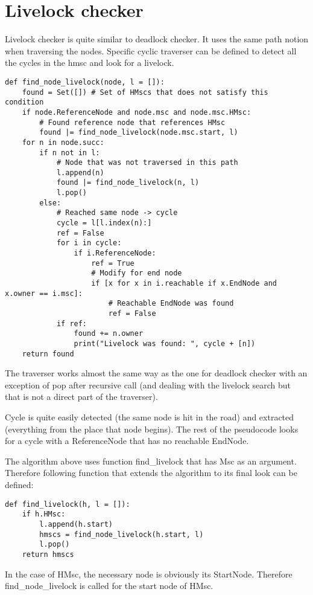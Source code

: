 \documentclass[11pt,oneside]{fithesis2}
\begin{document}
\section{Livelock checker}
Livelock checker is quite similar to deadlock checker. It uses the same path notion when traversing the nodes. Specific cyclic traverser can be defined to detect all the cycles in the hmsc and look for a livelock.
\begin{lstlisting}
def find_node_livelock(node, l = []):
    found = Set([]) # Set of HMscs that does not satisfy this condition
    if node.ReferenceNode and node.msc and node.msc.HMsc:
        # Found reference node that references HMsc
        found |= find_node_livelock(node.msc.start, l)
    for n in node.succ:
        if n not in l:
            # Node that was not traversed in this path
            l.append(n)
            found |= find_node_livelock(n, l)
            l.pop()
        else:
            # Reached same node -> cycle
            cycle = l[l.index(n):]
            ref = False
            for i in cycle:
                if i.ReferenceNode:
                    ref = True
                    # Modify for end node
                    if [x for x in i.reachable if x.EndNode and x.owner == i.msc]:
                        # Reachable EndNode was found
                        ref = False
            if ref:
                found += n.owner
                print("Livelock was found: ", cycle + [n])
    return found
\end{lstlisting}

The traverser works almost the same way as the one for deadlock checker with an exception of pop after recursive call (and dealing with the livelock search but that is not a direct part of the traverser).

Cycle is quite easily detected (the same node is hit in the road) and extracted (everything from the place that node begins). The rest of the pseudocode looks for a cycle with a ReferenceNode that has no reachable EndNode.

The algorithm above uses function find\_livelock that has Msc as an argument. Therefore following function that extends the algorithm to its final look can be defined:
\begin{lstlisting}
def find_livelock(h, l = []):
    if h.HMsc:
        l.append(h.start)
        hmscs = find_node_livelock(h.start, l)
        l.pop()
    return hmscs
\end{lstlisting}
In the case of HMsc, the necessary node is obviously its StartNode. Therefore find\_node\_livelock is called for the start node of HMsc.
\end{document}
